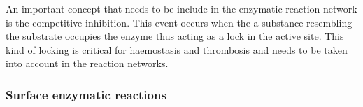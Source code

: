 \documentclass[%
 nofootinbib,
 amsmath,amssymb,
 aps,
 pra,
]{revtex4-1}
\begin{document}
An important concept that needs to be include in the enzymatic reaction network is the competitive inhibition. This event occurs when the a substance resembling the substrate occupies the enzyme thus acting as a lock in the active site. This kind of locking is critical for haemostasis and thrombosis and needs to be taken into account in the reaction networks.\\
\subsubsection{Surface enzymatic reactions}


\end{document}
